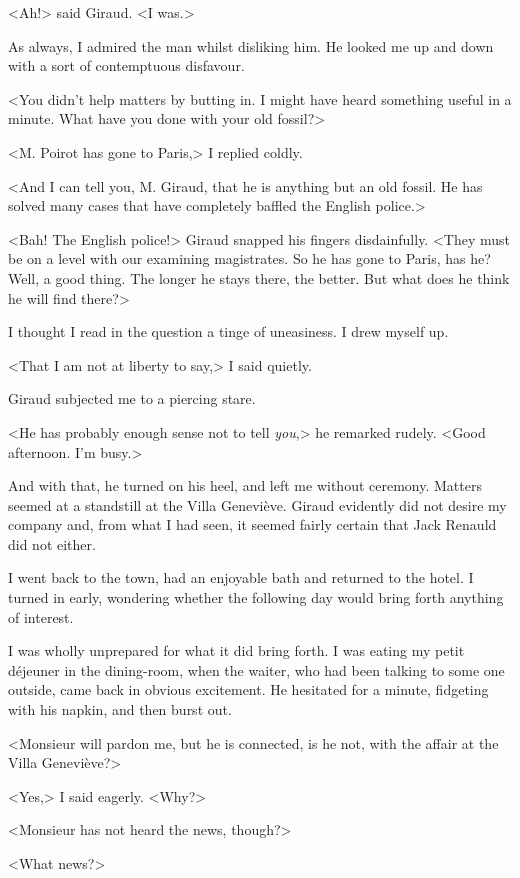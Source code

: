  <Ah!> said Giraud. <I was.> 

 As always, I admired the man whilst disliking him. He looked me up and down with a sort of contemptuous disfavour. 

 <You didn't help matters by butting in. I might have heard something useful in a minute. What have you done with your old fossil?> 

 <M. Poirot has gone to Paris,> I replied coldly. 

 <And I can tell you, M. Giraud, that he is anything but an old fossil. He has solved many cases that have completely baffled the English police.> 

 <Bah! The English police!> Giraud snapped his fingers disdainfully. <They must be on a level with our examining magistrates. So he has gone to Paris, has he? Well, a good thing. The longer he stays there, the better. But what does he think he will find there?> 

 I thought I read in the question a tinge of uneasiness. I drew myself up. 

 <That I am not at liberty to say,> I said quietly. 

 Giraud subjected me to a piercing stare. 

 <He has probably enough sense not to tell \emph{you},> he remarked rudely. <Good afternoon. I'm busy.> 

 And with that, he turned on his heel, and left me without ceremony. Matters seemed at a standstill at the Villa Geneviève. Giraud evidently did not desire my company and, from what I had seen, it seemed fairly certain that Jack Renauld did not either. 

 I went back to the town, had an enjoyable bath and returned to the hotel. I turned in early, wondering whether the following day would bring forth anything of interest. 

 I was wholly unprepared for what it did bring forth. I was eating my petit déjeuner in the dining-room, when the waiter, who had been talking to some one outside, came back in obvious excitement. He hesitated for a minute, fidgeting with his napkin, and then burst out. 

 <Monsieur will pardon me, but he is connected, is he not, with the affair at the Villa Geneviève?> 

 <Yes,> I said eagerly. <Why?> 

 <Monsieur has not heard the news, though?> 

 <What news?> 

